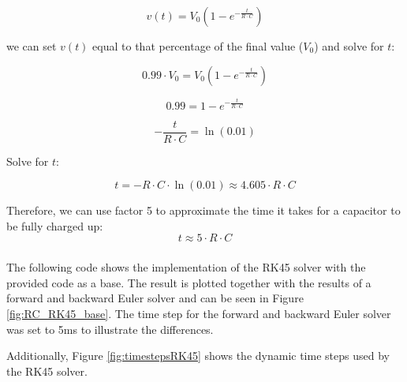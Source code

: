\documentclass{article}
\begin{document}
    \[
        v(t) = V_0 \left(1 - e^{-\frac{t}{R \cdot C}}\right)
    \]

    we can set \(v(t)\) equal to that percentage of the final value (\(V_0\)) and solve for \(t\):

    \[
        0.99 \cdot V_0 = V_0 \left(1 - e^{-\frac{t}{R \cdot C}}\right)
    \]


    \[
        0.99 = 1 - e^{-\frac{t}{R \cdot C}}
    \]

    \[
        -\frac{t}{R \cdot C} = \ln(0.01)
    \]

    Solve for \(t\):

    \[
        t = -R \cdot C \cdot \ln(0.01) \approx 4.605 \cdot R \cdot C
    \]

    Therefore, we can use factor 5 to approximate the time it takes for a capacitor to be fully charged up:
    \[
        t \approx 5 \cdot R \cdot C
    \]

    \clearpage

    \subsubsection{}
    The following code shows the implementation of the RK45 solver with the provided code as a base.
    The result is plotted together with the results of a forward and backward Euler solver and can be seen in Figure \ref{fig:RC_RK45_base}.
    The time step for the forward and backward Euler solver was set to 5ms to illustrate the differences.

    \vspace{10pt}
    Additionally, Figure \ref{fig:timestepsRK45} shows the dynamic time steps used by the RK45 solver.
\end{document}
